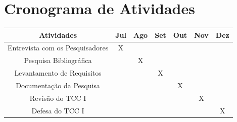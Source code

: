 

\apendices
    \chapter{Cronograma de Atividades}
    \label{apen:cronograma}

    \begin{quadro}[h]
        \caption{Cronograma de Atividades TCC I}
        \centering
        \begin{tabular}{c c c c c c c} \hline
            \label{quad:cronograma-atividades}
            \textbf{Atividades}             & \textbf{Jul} & \textbf{Ago} & \textbf{Set} & \textbf{Out} & \textbf{Nov} & \textbf{Dez} \\ \hline
            Entrevista com os Pesquisadores & X            &              &              &              &              &              \\ \hline
            Pesquisa Bibliográfica          &              & X            &              &              &              &              \\ \hline
            Levantamento de Requisitos      &              &              & X            &              &              &              \\ \hline
            Documentação da Pesquisa        &              &              &              & X            &              &              \\ \hline
            Revisão do TCC I                &              &              &              &              & X            &              \\ \hline
            Defesa do TCC I                 &              &              &              &              &              & X            \\ \hline
        \end{tabular}
    \end{quadro}

